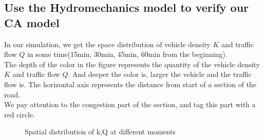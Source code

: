 \documentclass[UTF8]{mcmthesis}
\begin{document}
\subsection{Use the Hydromechanics model to verify our CA model}
\indent In our simulation, we get the space distribution of vehicle density $K$ and traffic flow $Q$ in some time(15min, 30min, 45min, 60min from the beginning).\\
\indent The depth of the color in the figure represents the quantity of the vehicle density $K$ and traffic flow $Q$. And deeper the color is, larger the vehicle and the traffic flow is. The horizontal axis represents the distance from start of a section of the road.\\
\indent We pay attention to the congestion part of the section, and tag this part with a red circle.\\
\begin{figure}[H]
\centering
{}
 \caption{Spatial distribution of k,Q at different moments} \label{fig:1}
\end{figure}
\end{document}

